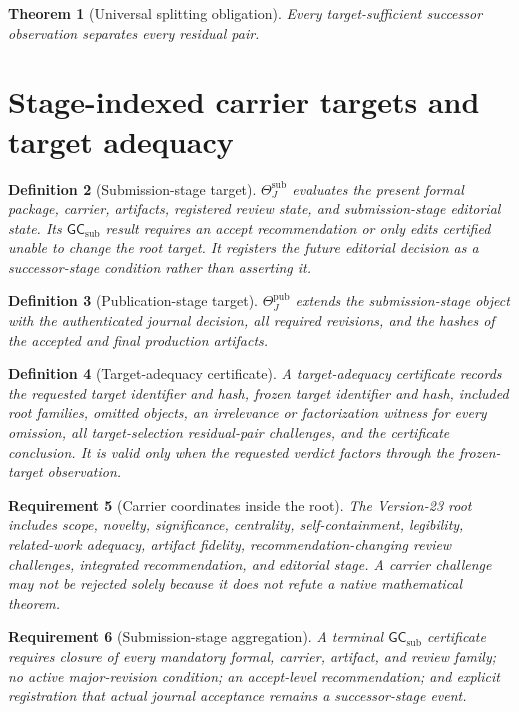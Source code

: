 \documentclass[10pt]{article}
\newtheorem{definition}{Definition}[section]
\newtheorem{theorem}[definition]{Theorem}
\newtheorem{requirement}[definition]{Requirement}
\newcommand{\Target}{\Theta}
\newcommand{\GCsub}{\mathsf{GC}_{\mathrm{sub}}}
\begin{document}
\begin{theorem}[Universal splitting obligation]
Every target-sufficient successor observation separates every residual pair.
\end{theorem}



\section{Stage-indexed carrier targets and target adequacy}

\begin{definition}[Submission-stage target]
$\Target_J^{\mathrm{sub}}$ evaluates the present formal package, carrier, artifacts, registered review state, and submission-stage editorial state.  Its $\GCsub$ result requires an accept recommendation or only edits certified unable to change the root target.  It registers the future editorial decision as a successor-stage condition rather than asserting it.
\end{definition}

\begin{definition}[Publication-stage target]
$\Target_J^{\mathrm{pub}}$ extends the submission-stage object with the authenticated journal decision, all required revisions, and the hashes of the accepted and final production artifacts.
\end{definition}

\begin{definition}[Target-adequacy certificate]
A target-adequacy certificate records the requested target identifier and hash, frozen target identifier and hash, included root families, omitted objects, an irrelevance or factorization witness for every omission, all target-selection residual-pair challenges, and the certificate conclusion.  It is valid only when the requested verdict factors through the frozen-target observation.
\end{definition}

\begin{requirement}[Carrier coordinates inside the root]
The Version-23 root includes scope, novelty, significance, centrality, self-containment, legibility, related-work adequacy, artifact fidelity, recommendation-changing review challenges, integrated recommendation, and editorial stage.  A carrier challenge may not be rejected solely because it does not refute a native mathematical theorem.
\end{requirement}

\begin{requirement}[Submission-stage aggregation]
A terminal $\GCsub$ certificate requires closure of every mandatory formal, carrier, artifact, and review family; no active major-revision condition; an accept-level recommendation; and explicit registration that actual journal acceptance remains a successor-stage event.
\end{requirement}
\end{document}
